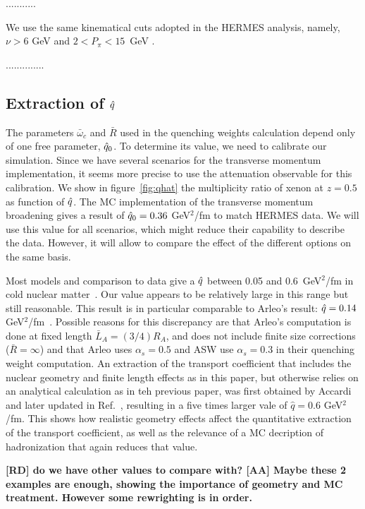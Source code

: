 ...........

We use the same kinematical cuts adopted in the HERMES analysis, namely, $\nu > 6$ GeV and $2 < P_\pi < 15$~GeV \cite{Airapetian:2007vu,Airapetian:2009jy}.

..............


\subsection{Extraction of ${\hat q}$}

The parameters $\bar\omega_c$ and $\bar R$ used in the quenching weights calculation depend only of one free parameter, ${\hat q}_0$. To determine its value, we need to calibrate our simulation. Since we have several scenarios for the transverse momentum implementation, it seems more precise to use the attenuation observable for this calibration. We show in figure~\ref{fig:qhat} the multiplicity ratio of xenon at $z=0.5$ as function of ${\hat q}$. The MC implementation of the transverse momentum broadening gives a result of ${\hat q}_0 = 0.36$ GeV$^2$/fm to match HERMES data. We will use this value for all scenarios, which might reduce their capability to describe the data. However, it will allow to compare the effect of the different options on the same basis.

Most models and comparison to data give a ${\hat q}$ between 0.05 and 0.6~GeV$^2$/fm in cold nuclear matter~\cite{Accardi:2009qv}. Our value appears to be relatively large in this range but still reasonable. This result is in particular comparable to Arleo's result: ${\hat q} = 0.14$ GeV$^2$/fm~\cite{Arleo:2002ph,Arleo:2003jz}. Possible reasons for this discrepancy are that Arleo's computation is done at fixed length $\bar L_A = (3/4) R_A$, and does not include finite size corrections ($\bar R = \infty$) and that Arleo uses $\alpha_s=0.5$ and ASW use $\alpha_s=0.3$ in their quenching weight computation. An extraction of the transport coefficient that includes the nuclear geometry and finite length effects as in this paper, but otherwise relies on an analytical calculation as in teh previous paper, was first obtained by Accardi \cite{Accardi:2007in} and later updated in Ref.~\cite{Accardi:2009qv}, resulting in a five times larger vale of $\hat q = 0.6$ GeV$^2$/fm. This shows how realistic geometry effects affect the quantitative extraction of the transport coefficient, as well as the relevance of a MC decription of hadronization that again reduces that value. 

{\bf [RD] do we have other values to compare with? [AA] Maybe these 2 examples are enough, showing the importance of geometry and MC treatment. However some rewrighting is in order.}



